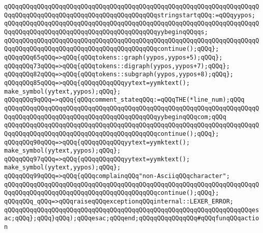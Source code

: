 \verb|qQQqqQQqqQQqqQQqqQQqqQQqqQQqqQQqqQQqqQQqqQQqqQQqqQQqqQQqqQQqqQQqqQQqqQQqqQQqqQQqqQQqqQQqqQQqqQQqqQQqqQQqqQQqqQQqstringstartqQQq:=qQQqyypos;|\newline
\verb|qQQqqQQqqQQqqQQqqQQqqQQqqQQqqQQqqQQqqQQqqQQqqQQqqQQqqQQqqQQqqQQqqQQqqQQqqQQqqQQqqQQqqQQqqQQqqQQqqQQqqQQqqQQqqQQqyybeginqQQqqs;|\newline
\verb|qQQqqQQqqQQqqQQqqQQqqQQqqQQqqQQqqQQqqQQqqQQqqQQqqQQqqQQqqQQqqQQqqQQqqQQqqQQqqQQqqQQqqQQqqQQqqQQqqQQqqQQqqQQqqQQqcontinue();qQQq};|\newline
\verb|qQQqqQQq65qQQq=>qQQq{qQQqtokens::graph(yypos,yypos+5);qQQq};|\newline
\verb|qQQqqQQq73qQQq=>qQQq{qQQqtokens::digraph(yypos,yypos+7);qQQq};|\newline
\verb|qQQqqQQq82qQQq=>qQQq{qQQqtokens::subgraph(yypos,yypos+8);qQQq};|\newline
\verb|qQQqqQQq85qQQq=>qQQq{qQQqqQQqqQQqyytext=yymktext();|\newline
\verb|make_symbol(yytext,yypos);qQQq};|\newline
\verb|qQQqqQQq9qQQq=>qQQq{qQQqcomment_stateqQQq:=qQQqTHE(*line_num);qQQq|\newline
\verb|qQQqqQQqqQQqqQQqqQQqqQQqqQQqqQQqqQQqqQQqqQQqqQQqqQQqqQQqqQQqqQQqqQQqqQQqqQQqqQQqqQQqqQQqqQQqqQQqqQQqqQQqqQQqqQQqyybeginqQQqcom;qQQq|\newline
\verb|qQQqqQQqqQQqqQQqqQQqqQQqqQQqqQQqqQQqqQQqqQQqqQQqqQQqqQQqqQQqqQQqqQQqqQQqqQQqqQQqqQQqqQQqqQQqqQQqqQQqqQQqqQQqqQQqcontinue();qQQq};|\newline
\verb|qQQqqQQq90qQQq=>qQQq{qQQqqQQqqQQqyytext=yymktext();|\newline
\verb|make_symbol(yytext,yypos);qQQq};|\newline
\verb|qQQqqQQq97qQQq=>qQQq{qQQqqQQqqQQqyytext=yymktext();|\newline
\verb|make_symbol(yytext,yypos);qQQq};|\newline
\verb|qQQqqQQq99qQQq=>qQQq{qQQqcomplainqQQq"non-AsciiqQQqcharacter";|\newline
\verb|qQQqqQQqqQQqqQQqqQQqqQQqqQQqqQQqqQQqqQQqqQQqqQQqqQQqqQQqqQQqqQQqqQQqqQQqqQQqqQQqqQQqqQQqqQQqqQQqqQQqqQQqqQQqqQQqcontinue();qQQq};|\newline
\verb|qQQqqQQq_qQQq=>qQQqraiseqQQqexceptionqQQqinternal::LEXER_ERROR;|\newline
\newline
\verb|qQQqqQQqqQQqqQQqqQQqqQQqqQQqqQQqqQQqqQQqqQQqqQQqqQQqqQQqqQQqqQQqqQQqesac;qQQq};qQQq}qQQq);qQQqesac;qQQqend;qQQqqQQqqQQqqQQq#qQQqfunqQQqaction|\newline
